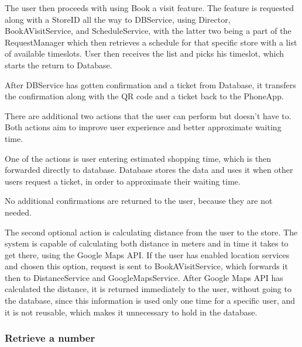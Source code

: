   

The user then proceeds with using Book a visit feature. The feature is requested along with a StoreID all the way to DBService, using Director, BookAVisitService, and ScheduleService, with the latter two being a part of the RequestManager which then retrieves a schedule for that specific store with a list of available timeslots. User then receives the list and picks his timeslot, which starts the return to Database.  

  
After DBService has gotten confirmation and a ticket from Database, it transfers the confirmation along with the QR code and a ticket back to the PhoneApp.  
  
There are additional two actions that the user can perform but doesn't have to. Both actions aim to improve user experience and better approximate waiting time.  

  

One of the actions is user entering estimated shopping time, which is then forwarded directly to database. Database stores the data and uses it when other users request a ticket, in order to approximate their waiting time.  

No additional confirmations are returned to the user, because they are not needed.  

  

The second optional action is calculating distance from the user to the store. The system is capable of calculating both distance in meters and in time it takes to get there, using the Google Maps API. If the user has enabled location services and chosen this option, request is sent to BookAVisitService, which forwards it then to DistanceService and GoogleMapsService. After Google Maps API has calculated the distance, it is returned immediately to the user, without going to the database, since this information is used only one time for a specific user, and it is not reusable, which makes it unnecessary to hold in the database.  
\newpage

\subsubsection{Retrieve a number }


